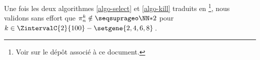 \leavevmode
\smallskip

Une fois les deux algorithmes \ref{algo-select} et \ref{algo-kill} traduits en \python
\footnote{
	Voir sur le dépôt associé à ce document.
},
nous validons sans effort que $\consprod \notin \NNssquare$ pour $k \in \ZintervalC{2}{100} - \setgene{2, 4, 6, 8}$\,.
